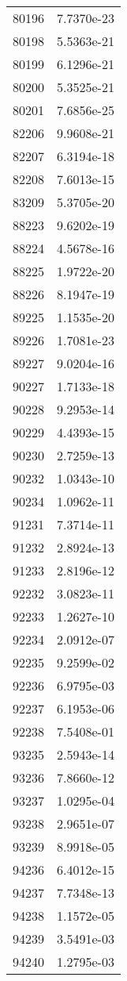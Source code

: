 \begin{table}[h!]
\begin{tabular}{|| c || c |}
80196 & 7.7370e-23 \\
80198 & 5.5363e-21 \\
80199 & 6.1296e-21 \\
80200 & 5.3525e-21 \\
80201 & 7.6856e-25 \\
82206 & 9.9608e-21 \\
82207 & 6.3194e-18 \\
82208 & 7.6013e-15 \\
83209 & 5.3705e-20 \\
88223 & 9.6202e-19 \\
88224 & 4.5678e-16 \\
88225 & 1.9722e-20 \\
88226 & 8.1947e-19 \\
89225 & 1.1535e-20 \\
89226 & 1.7081e-23 \\
89227 & 9.0204e-16 \\
90227 & 1.7133e-18 \\
90228 & 9.2953e-14 \\
90229 & 4.4393e-15 \\
90230 & 2.7259e-13 \\
90232 & 1.0343e-10 \\
90234 & 1.0962e-11 \\
91231 & 7.3714e-11 \\
91232 & 2.8924e-13 \\
91233 & 2.8196e-12 \\
92232 & 3.0823e-11 \\
92233 & 1.2627e-10 \\
92234 & 2.0912e-07 \\
92235 & 9.2599e-02 \\
92236 & 6.9795e-03 \\
92237 & 6.1953e-06 \\
92238 & 7.5408e-01 \\
93235 & 2.5943e-14 \\
93236 & 7.8660e-12 \\
93237 & 1.0295e-04 \\
93238 & 2.9651e-07 \\
93239 & 8.9918e-05 \\
94236 & 6.4012e-15 \\
94237 & 7.7348e-13 \\
94238 & 1.1572e-05 \\
94239 & 3.5491e-03 \\
94240 & 1.2795e-03 \\

\end{tabular}
\end{table}

